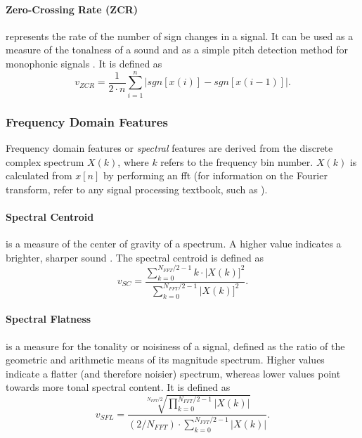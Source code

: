 \paragraph{Zero-Crossing Rate (ZCR)}
\label{para:zcr}
represents the rate of the number of sign changes in a signal.
It can be used as a measure of the tonalness of a sound \citep{lykartsis2014}
and as a simple pitch detection method for monophonic signals \citep{web:pitchdetection2019}. It is defined as
\begin{equation}
  v_{ZCR} = \frac{1} {2\cdot{n}}\sum\limits_{i=1}^{n} |sgn[x(i)] - sgn[x(i - 1)]|.
\end{equation}

\subsubsection{Frequency Domain Features}
\label{subsubsec:spectral_features}
Frequency domain features or \textit{spectral} features are derived from the
discrete complex spectrum $X(k)$, where $k$ refers to the frequency bin number.
$X(k)$ is calculated from $x[n]$ by performing an \gls{fft} (for information on
the Fourier transform, refer to any signal processing textbook, such as
\citet{oppenheim2014}).

\paragraph{Spectral Centroid}
\label{para:centroid}
is a measure of the center of gravity of a
spectrum. A higher value indicates a brighter, sharper sound \citep{lerch2012}.
The spectral centroid is defined as
\begin{equation}
  v_{SC} = \frac{ \sum\limits_{k=0}^{N_{FFT}/2-1} k\cdot{|X(k)]^2} }
  { \sum\limits_{k=0}^{N_{FFT}/2-1} |X(k)]^2 }.
\end{equation}

\paragraph{Spectral Flatness}
\label{para:flatness}
is a measure for the tonality or noisiness of a signal, defined as the ratio of
the geometric and arithmetic means of its magnitude spectrum. Higher values
indicate a flatter (and therefore noisier) spectrum, whereas lower values point
towards more tonal spectral content. It is defined as
\begin{equation}
  v_{SFL} = \frac{ \sqrt[N_{FFT}/2]{ \prod\limits_{k=0}^{N_{FFT}/2-1} |X(k)| } }
  { (2/N_{FFT}) \cdot{\sum\limits_{k=0}^{N_{FFT}/2-1} |X(k)|} }.
\end{equation}

